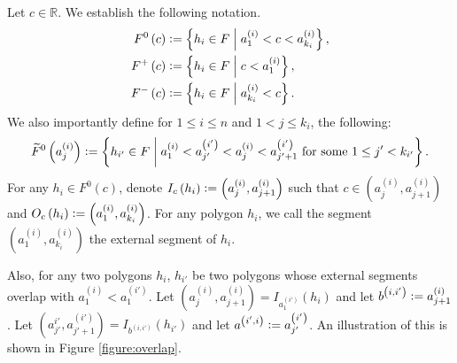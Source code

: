 \documentclass[12pt]{article}
\theoremstyle{definition}
\newcommand{\defeq}{\vcentcolon=}
\begin{document}
     Let $c \in \mathbb{R}$.
     We establish the following notation.
     \begin{align*}
         F^{0}\left(c\right) &\defeq
         \left\{h_{i} \in F \;\middle|\;
         a_{1}^{\left(i\right)}
         < c < a_{k_{i}}^{\left(i\right)}\right\}, \\
         F^{+}\left(c\right) &\defeq
         \left\{h_{i} \in F \;\middle|\;
         c < a_{1}^{\left(i\right)}\right\},\\
         F^{-}\left(c\right) &\defeq
         \left\{h_{i} \in F
         \;\middle|\; a_{k_{i}}^{\left(i\right)} < c\right\}.
     \end{align*}
     We also importantly define for
     $1 \leq i \leq n$ and 
     $1 < j \leq k_{i}$, 
     the following:
     \begin{gather*}
         \widetilde{F}^{0}\left(a_{j}^{\left(i\right)}\right)
         \defeq \left\{
         h_{i'} \in F \;\middle|\;
         a_{1}^{\left(i\right)} < a_{j'}^{\left(i'\right)}
         < a_{j}^{\left(i\right)}
         < a_{j'+1}^{\left(i'\right)}
         \text{ for some }
         1 \leq j' < k_{i'} \right\}.
     \end{gather*}
     For any $h_{i} \in F^{0}\left(c\right)$,
     denote $I_{c}\left(h_{i}\right)
     \defeq \left(a_{j}^{\left(i\right)},
     a_{j+1}^{\left(i\right)}\right)$ 
     such that $c \in 
     \left(a_{j}^{\left(i\right)},
     a_{j+1}^{\left(i\right)}\right)$ 
     and $O_{c}\left(h_{i}\right)
     \defeq \left(a_{1}^{\left(i\right)},
     a_{k_{i}}^{\left(i\right)}\right)$.
     For any polygon $h_{i}$,
     we call the segment
     $\left(a_{1}^{\left(i\right)},
     a_{k_{i}}^{\left(i\right)}\right)$
     the external
     segment of $h_{i}$.

     Also, for any two polygons
     $h_{i}$, $h_{i'}$ be two
     polygons whose external segments
     overlap with
     $a_1^{\left(i\right)} < a_1^{\left(i'\right)}$.
     Let $\left(a_{j}^{\left(i\right)},
     a_{j+1}^{\left(i\right)}\right) =
     I_{a_1^{\left(i'\right)}}\left(h_{i}\right)$
     and let
     $b^{\left(i, i'\right)} \defeq a_{j+1}^{\left(i\right)}$.
     Let $\left(a_{j'}^{i'}, a_{j'+1}^{\left(i'\right)}\right)
     = I_{b^{\left(i,i'\right)}}\left(h_{i'}\right)$ 
     and let $a^{\left(i',i\right)}
     \defeq a_{j'}^{\left(i'\right)}$.
     An illustration of 
     this is shown in Figure \ref{figure:overlap}.
\end{document}
